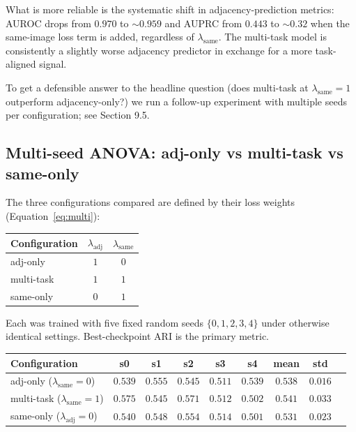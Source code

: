 \documentclass[12pt, a4paper]{article}
\begin{document}
What is more reliable is the systematic shift in adjacency-prediction
metrics: AUROC drops from $0.970$ to $\sim 0.959$ and AUPRC from $0.443$ to
$\sim 0.32$ when the same-image loss term is added, regardless of
$\lambda_{\text{same}}$. The multi-task model is consistently a slightly
worse adjacency predictor in exchange for a more task-aligned signal.

To get a defensible answer to the headline question (does multi-task at
$\lambda_{\text{same}} = 1$ outperform adjacency-only?) we run a follow-up
experiment with multiple seeds per configuration; see Section 9.5.


\subsection{Multi-seed ANOVA: adj-only vs multi-task vs same-only}

The three configurations compared are defined by their loss weights
(Equation~\eqref{eq:multi}):

\begin{center}
\begin{tabular}{lcc}
\toprule
\textbf{Configuration} & $\lambda_{\text{adj}}$ & $\lambda_{\text{same}}$ \\
\midrule
adj-only   & $1$ & $0$ \\
multi-task & $1$ & $1$ \\
same-only  & $0$ & $1$ \\
\bottomrule
\end{tabular}
\end{center}

Each was trained with five fixed random seeds $\{0, 1, 2, 3, 4\}$ under otherwise
identical settings. Best-checkpoint ARI is the primary metric.

\begin{center}
\begin{tabular}{lcccccc|cc}
\toprule
\textbf{Configuration} & \textbf{s0} & \textbf{s1} & \textbf{s2} & \textbf{s3} & \textbf{s4} & \textbf{mean} & \textbf{std} \\
\midrule
adj-only  ($\lambda_{\text{same}}=0$) & $0.539$ & $0.555$ & $0.545$ & $0.511$ & $0.539$ & $0.538$ & $0.016$ \\
multi-task ($\lambda_{\text{same}}=1$) & $0.575$ & $0.545$ & $0.571$ & $0.512$ & $0.502$ & $0.541$ & $0.033$ \\
same-only ($\lambda_{\text{adj}}=0$)  & $0.540$ & $0.548$ & $0.554$ & $0.514$ & $0.501$ & $0.531$ & $0.023$ \\
\bottomrule
\end{tabular}
\end{center}
\end{document}
